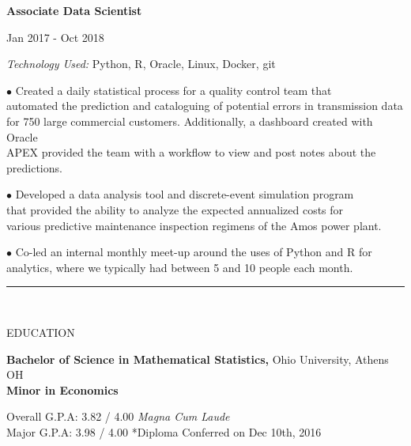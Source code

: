 \documentclass[12pt]{article}
\newcommand\tab[1][1cm]{\hspace*{#1}}
\newcommand\header[1][Section Header]{
    \vspace*{-2mm}
    \rule{6.5in}{3pt} \\
    \smallskip
    \begin{large}
	    \textsc{\textcolor{lblue}{#1}}
    \end{large}
    \medskip
}
\begin{document}
\begin{flushleft}
    \tab \textbf{Associate Data Scientist} \hfill {\footnotesize Jan 2017 - Oct 2018 \par}
    \tab[1.25cm] \textit{Technology Used:} Python, R, Oracle, Linux, Docker, git \\
    \vspace*{0.5mm}

    \tab[1.25cm] $\bullet$ Created a daily statistical process for a quality control team that \\
    \tab[1.6cm] automated the prediction and cataloguing of potential errors in transmission data \\
    \tab[1.6cm] for 750 large commercial customers. Additionally, a dashboard created with Oracle \\
    \tab[1.6cm] APEX provided the team with a workflow to view and post notes about the predictions. \\
    \vspace*{0.5mm}

    \tab[1.25cm] $\bullet$ Developed a data analysis tool and discrete-event simulation program \\
    \tab[1.6cm] that provided the ability to analyze the expected annualized costs for \\
    \tab[1.6cm] various predictive maintenance inspection regimens of the Amos power plant. \\
    \vspace*{0.5mm}

    \tab[1.25cm] $\bullet$ Co-led an internal monthly meet-up around the uses of Python and R for \\
    \tab[1.6cm] analytics, where we typically had between 5 and 10 people each month. \\
    \medskip

    \smallskip
  \end{flushleft}

  \begin{flushleft}
    \header[EDUCATION]

    \textbf{Bachelor of Science in Mathematical Statistics,} \hfill Ohio University, Athens OH \\
    \textbf{Minor in Economics}

    \tab[0.5cm] Overall G.P.A:  3.82 / 4.00 \tab[0.25cm] \textit{Magna Cum Laude} \\
    \tab[0.5cm] \hspace*{2.08mm}Major G.P.A: 3.98 / 4.00  \hfill \small{*Diploma Conferred on Dec 10th, 2016}

    \smallskip
  \end{flushleft}
  
\end{document}
